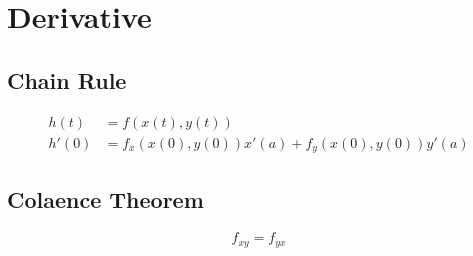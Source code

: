 \section{Derivative}

  \subsection{Chain Rule}

    \begin{align}
      h(t) &= f(x(t), y(t)) \\
      h'(0) &= f_{x}(x(0), y(0)) x'(a) + f_{y}(x(0), y(0)) y'(a)
    \end{align}

  \subsection{Colaence Theorem}

    \begin{equation}
      f_{xy} = f_{yx}
    \end{equation}
